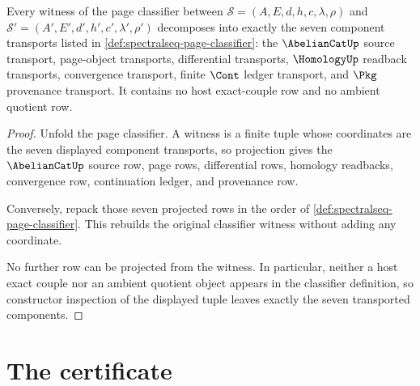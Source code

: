 \begin{theorem}
\label{thm:spectralseq-page-classifier-no-confusion}
Every witness of the page classifier between
$\mathcal S=(A,E,d,h,c,\lambda,\rho)$ and
$\mathcal S'=(A',E',d',h',c',\lambda',\rho')$ decomposes into exactly the
seven component transports listed in
\autoref{def:spectralseq-page-classifier}: the $\AbelianCatUp$ source
transport, page-object transports, differential transports, $\HomologyUp$
readback transports, convergence transport, finite $\Cont$ ledger transport,
and $\Pkg$ provenance transport. It contains no host exact-couple row and no
ambient quotient row.
\end{theorem}
\begin{proof}
Unfold the page classifier. A witness is a finite tuple whose coordinates are
the seven displayed component transports, so projection gives the
$\AbelianCatUp$ source row, page rows, differential rows, homology readbacks,
convergence row, continuation ledger, and provenance row.

Conversely, repack those seven projected rows in the order of
\autoref{def:spectralseq-page-classifier}. This rebuilds the original
classifier witness without adding any coordinate.

No further row can be projected from the witness. In particular, neither a
host exact couple nor an ambient quotient object appears in the classifier
definition, so constructor inspection of the displayed tuple leaves exactly
the seven transported components.
\end{proof}

\section{The certificate}
\label{sec:spectralseq-certificate}

